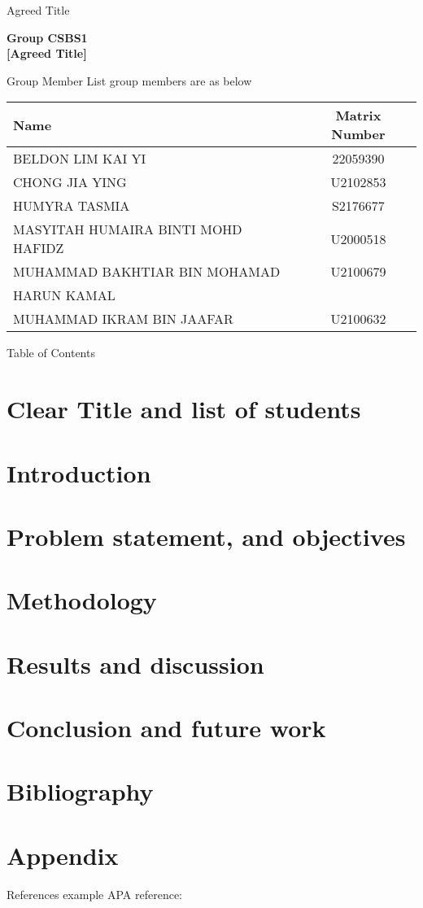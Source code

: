 \documentclass{beamer}
\begin{document}
\begin{frame}{Agreed Title}
\begin{center}
{\LARGE \textbf{Group CSBS1}} \\[1cm]
{\LARGE \textbf{[Agreed Title]}}
\end{center}
\end{frame}

\begin{frame}{Group Member List}
group members are as below
\begin{table}
\begin{center}
\small
    \begin{tabular}{|l|c|}
        \hline
        \textbf{Name} & \textbf{Matrix Number} \\ \hline
        BELDON LIM KAI YI  & 22059390  \\ \hline
        CHONG JIA YING  & U2102853  \\ \hline
        HUMYRA TASMIA  & S2176677  \\ \hline
        MASYITAH HUMAIRA BINTI MOHD HAFIDZ  & U2000518  \\ \hline
        MUHAMMAD BAKHTIAR BIN MOHAMAD  & U2100679 \\
        HARUN KAMAL  &  \\ \hline
        MUHAMMAD IKRAM BIN JAAFAR  & U2100632  \\ \hline
    \end{tabular}
\end{center}
\end{table}
\end{frame}

\begin{frame}{Table of Contents}
\tableofcontents
\end{frame}

\section{Clear Title and list of students}
\section{Introduction}
\section{Problem statement, and objectives}
\section{Methodology}
\section{Results and discussion}
\section{Conclusion and future work}
\section{Bibliography}
\section{Appendix}

\begin{frame}{References}
example APA reference: \\ 
\footnotesize
\cite{SAKA201325}


\end{frame}
\end{document}

